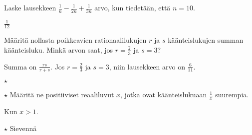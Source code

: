 \begin{tehtavasivu}
\begin{tehtava}
	Laske lausekkeen $\frac{1}{n}-\frac{1}{2n}+\frac{1}{3n}$ arvo, kun tiedetään, että $n = 10$.
	\begin{vastaus}
		$\frac{1}{12}$
	\end{vastaus}
\end{tehtava}
\begin{tehtava}
	Määritä nollasta poikkeavien rationaalilukujen \(r\) ja \(s\) käänteislukujen summan käänteisluku. Minkä arvon saat, jos \(r=\frac{2}{3}\) ja \(s=3\)?
	\begin{vastaus}
		Summa on $\frac{rs}{r+s}$. Jos \(r=\frac{2}{3}\) ja \(s=3\), niin lausekkeen arvo on \(\frac{6}{11}\).
	\end{vastaus}
\end{tehtava}

\begin{tehtava} $\star$
	\begin{alakohdat}
	\end{alakohdat}
	\begin{vastaus}
		\begin{alakohdat}
			\alakohta{$\frac{1}{n(n+1)}$}
			\alakohta{$1-\frac{1}{n}$}
		\end{alakohdat}
	\end{vastaus}
\end{tehtava}

\begin{tehtava} $\star$
	Määritä ne positiiviset reaaliluvut $x$, jotka ovat käänteislukuaan $\frac{1}{x}$ suurempia.
	\begin{vastaus}
	 Kun $x>1$.
	\end{vastaus}
\end{tehtava}

\begin{tehtava} $\star $
Sievennä
 \begin{alakohdat}
 \end{alakohdat}
 \begin{vastaus}
	\begin{alakohdat}
		\alakohta{$a+1$}
		\alakohta{$4a$}
	\end{alakohdat}
 \end{vastaus}
\end{tehtava}


\end{tehtavasivu}
